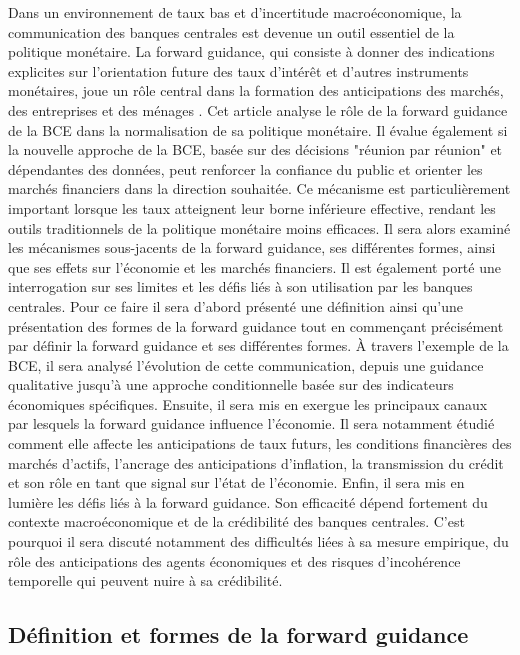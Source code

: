  Dans un environnement de taux bas et d’incertitude macroéconomique, la communication des banques centrales est devenue un outil essentiel de la politique monétaire. La forward guidance, qui consiste à donner des indications explicites sur l’orientation future des taux d’intérêt et d’autres instruments monétaires, joue un rôle central dans la formation des anticipations des marchés, des entreprises et des ménages \citep{hofmann2024ecb}. Cet article analyse le rôle de la forward guidance de la BCE dans la normalisation de sa politique monétaire. Il évalue également si la nouvelle approche de la BCE, basée sur des décisions "réunion par réunion" et dépendantes des données, peut renforcer la confiance du public et orienter les marchés financiers dans la direction souhaitée. Ce mécanisme est particulièrement important lorsque les taux atteignent leur borne inférieure effective, rendant les outils traditionnels de la politique monétaire moins efficaces. Il sera alors examiné les mécanismes sous-jacents de la forward guidance, ses différentes formes, ainsi que ses effets sur l’économie et les marchés financiers. Il est également porté une interrogation sur ses limites et les défis liés à son utilisation par les banques centrales. Pour ce faire il sera d'abord présenté une définition ainsi qu'une présentation des formes de la forward guidance tout en commençant précisément par définir la forward guidance et ses différentes formes. À travers l’exemple de la BCE, il sera analysé l’évolution de cette communication, depuis une guidance qualitative jusqu’à une approche conditionnelle basée sur des indicateurs économiques spécifiques. Ensuite, il sera mis en exergue les principaux canaux par lesquels la forward guidance influence l’économie. Il sera notamment étudié comment elle affecte les anticipations de taux futurs, les conditions financières des marchés d’actifs, l’ancrage des anticipations d’inflation, la transmission du crédit et son rôle en tant que signal sur l’état de l’économie. Enfin, il sera mis en lumière les défis liés à la forward guidance. Son efficacité dépend fortement du contexte macroéconomique et de la crédibilité des banques centrales. C'est pourquoi il sera discuté notamment des difficultés liées à sa mesure empirique, du rôle des anticipations des agents économiques et des risques d’incohérence temporelle qui peuvent nuire à sa crédibilité. 

\subsection{Définition et formes de la forward guidance}


